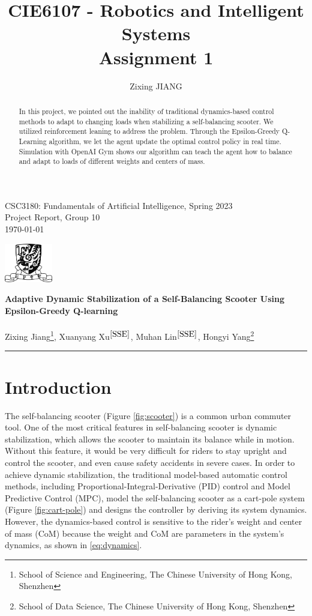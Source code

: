 \documentclass[10pt,a4paper]{article}
\title{\textbf{CIE6107 - Robotics and Intelligent Systems \\Assignment 1}}
\author{Zixing JIANG}
\begin{document}
	
\begin{flushleft}
	CSC3180: Fundamentals of Artificial Intelligence, Spring 2023\\
	Project Report, Group 10\\
	\today
\end{flushleft}
	
\begin{flushright}\vspace{-22mm}
	\includegraphics[height=1.7cm]{figure/logo.png}
\end{flushright}
	
\begin{center}\vspace{0.2cm}
	\textbf{\Large Adaptive Dynamic Stabilization of a Self-Balancing Scooter Using Epsilon-Greedy Q-learning}\\~\\
	\large Zixing Jiang\footnote{School of Science and Engineering, The Chinese University of Hong Kong, Shenzhen\label{SSE}}, Xuanyang Xu$^{\ref{SSE}}$, Muhan Lin$^{\ref{SSE}}$, Hongyi Yang\footnote{School of Data Science, The Chinese University of Hong Kong, Shenzhen}
\end{center}
{\noindent}\rule{\linewidth}{0.1mm}

\begin{abstract}
In this project, we pointed out the inability of traditional dynamics-based control methods to adapt to changing loads when stabilizing a self-balancing scooter. We utilized reinforcement leaning to address the problem. Through the Epsilon-Greedy Q-Learning algorithm, we let the agent update the optimal control policy in real time. Simulation with OpenAI Gym shows our algorithm can teach the agent how to balance and adapt to loads of different weights and centers of mass. 
\end{abstract} 

\section{Introduction}
The self-balancing scooter (Figure \ref{fig:scooter}) is a common urban commuter tool. One of the most critical features in self-balancing scooter is dynamic stabilization,  which allows the scooter to maintain its balance while in motion. Without this feature, it would be very difficult for riders to stay upright and control the scooter, and even cause safety accidents in severe cases. In order to achieve dynamic stabilization, the traditional model-based automatic control methods, including Proportional-Integral-Derivative (PID) control and Model Predictive Control (MPC), model the self-balancing scooter as a cart-pole system (Figure \ref{fig:cart-pole}) and designs the controller by deriving its system dynamics. However, the dynamics-based control is sensitive to the rider's weight and center of mass (CoM) because the weight and CoM are parameters in the system's dynamics, as shown in \eqref{eq:dynamics}.
\end{document}
